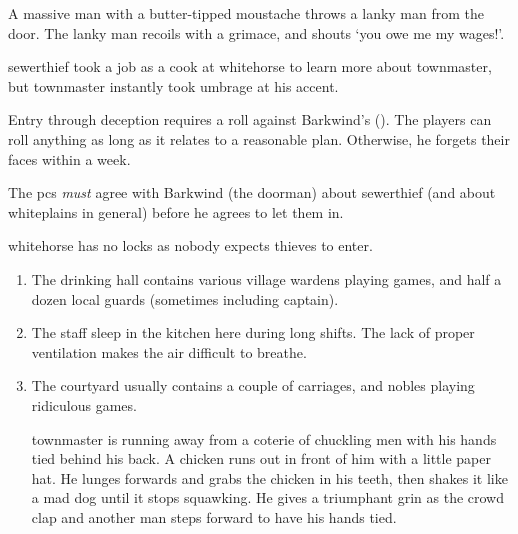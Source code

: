 \begin{multicols}{2}
\begin{boxtext}
  A massive man with a butter-tipped moustache throws a lanky man from the door.
  The lanky man recoils with a grimace, and shouts `you owe me my wages!'.

\end{boxtext}


\begin{exampletext}
  \Gls{sewerthief} took a job as a cook at \gls{whitehorse} to learn more about \gls{townmaster}, but \gls{townmaster} instantly took umbrage at his  accent.
\end{exampletext}


Entry through deception requires a roll against Barkwind's  (\tn).
The players can roll anything as long as it relates to a reasonable plan.
Otherwise, he forgets their faces within a week.

The \glspl{pc} \emph{must} agree with Barkwind (the doorman) about \gls{sewerthief} (and about \gls{whiteplains} in general) before he agrees to let them in.

\Gls{whitehorse} has no locks as nobody expects thieves to enter.
 
\begin{enumerate}
  \item
  The drinking hall contains various \gls{village} \glspl{warden} playing games, and half a dozen local guards (sometimes including \gls{captain}).
  \label{horseHall}
  \item
  \label{horseKitch}
  The staff sleep in the kitchen here during long shifts.
  The lack of proper ventilation makes the air difficult to breathe.
  \item
  \label{horseYard}
  The courtyard usually contains a couple of carriages, and nobles playing ridiculous games.
  \begin{boxtext}

    \Gls{townmaster} is running away from a coterie of chuckling men with his hands tied behind his back.
     A chicken runs out in front of him with a little paper hat.
     He lunges forwards and grabs the chicken in his teeth, then shakes it like a mad dog until it stops squawking.
     He gives a triumphant grin as the crowd clap and another man steps forward to have his hands tied.

  \end{boxtext}


\end{enumerate}
\end{multicols}
